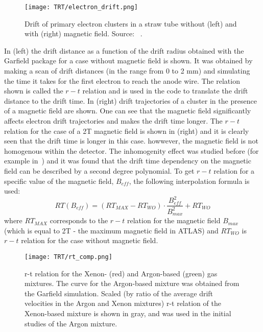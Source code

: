 \begin{figure}
\begin{center}
 \texttt{[image: TRT/electron\_drift.png]}
\caption {Drift of primary electron clusters in a straw tube without (left) and with (right) magnetic field. Source: ~\cite{cwetanski_thesis}. 
}
\label{fig:clusterDriftInTube}
\end{center}
\end{figure}

In  (left) the drift distance as a function of the drift radius obtained with the Garfield package for a case without magnetic field is shown.
It was obtained by making a scan of drift distances (in the range from 0 to 2 mm) and simulating the time it takes for the first electron to reach the anode wire.
The relation shown is called the $r-t$ relation and is used in the code to translate the drift distance to the drift time.
In  (right) drift trajectories of a cluster in the presence of a magnetic field are shown. One can see that the magnetic field
significantly affects electron drift trajectories and makes the drift time longer. The $r-t$ relation for the case of a 2T magnetic field is shown
in  (right) and it is clearly seen that the drift time is longer in this case. howwever, the magnetic field is not homogenous within the detector.
The inhomogenity effect was studied before (for example in~\cite{esben_thesis}) and it was found that the drift time dependency on the magnetic field can be 
described by a second degree polynomial. 
To get $r-t$ relation for a specific value of the magnetic field, $B_{eff}$, the following interpolation formula is used:
\begin{displaymath}
    RT(B_{eff}) = (RT_{MAX} - RT_{WO}) \cdot \dfrac{B_{eff}^2}{B_{max}^2} + RT_{WO}
\end{displaymath}
where $RT_{MAX}$ corresponds to the $r-t$ relation for the magnetic field $B_{max}$ (which is equal to 2T - the maximum magnetic field in ATLAS) and $RT_{WO}$ is 
$r-t$ relation for the case without magnetic field.

\begin{figure}
\centering
 \texttt{[image: TRT/rt\_comp.png]}
\caption{r-t relation for the Xenon- (red) and Argon-based (green) gas mixtures. The curve for the Argon-based mixture was obtained from the Garfield simulation. 
Scaled (by ratio of the average drift velocities in the Argon and Xenon mixtures) 
r-t relation of the Xenon-based mixture is shown in gray, and was used in the initial studies of the Argon mixture.
}
\label{fig:rt_comp}
\end{figure}


